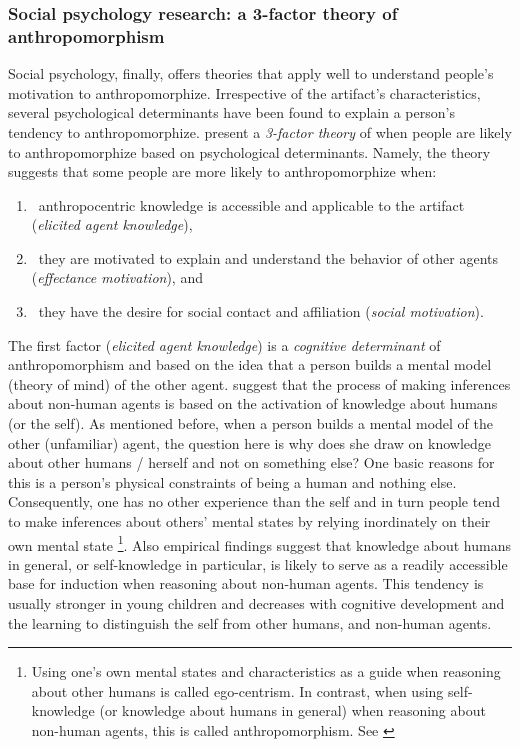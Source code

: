 \documentclass{frontiersSCNS} %
\begin{document}
\subsubsection{Social psychology research: a 3-factor theory of anthropomorphism}
\label{sec:psychological-factors}

Social psychology, finally, offers theories that apply well to understand
people's motivation to anthropomorphize. Irrespective of the artifact's
characteristics, several psychological determinants have been found to explain a
person's tendency to anthropomorphize. \cite{epley_seeing_2007} present a
\emph{3-factor theory} of when people are likely to anthropomorphize based on
psychological determinants. Namely, the theory suggests that some people are
more likely to anthropomorphize when: 

\begin{enumerate}
	\item ~anthropocentric knowledge is accessible and applicable to the artifact (\textit{elicited agent knowledge}),
	\item ~they are motivated to explain and understand the behavior of other agents (\textit{effectance motivation}), and
	\item ~they have the desire for social contact and affiliation (\textit{social motivation}).
\end{enumerate}

The first factor (\textit{elicited agent knowledge}) is a \emph{cognitive
determinant} of anthropomorphism and based on the idea that a person builds a
mental model (theory of mind) of the other agent. \citet{epley_seeing_2007}
suggest that the process of making inferences about non-human agents is based on
the activation of knowledge about humans (or the self). As mentioned before,
when a person builds a mental model of the other (unfamiliar) agent, the
question here is why does she draw on knowledge about other humans / herself and
not on something else? One basic reasons for this is a person's physical
constraints of being a human and nothing else. Consequently, one has no other
experience than the self and in turn people tend to make inferences about
others' mental states by relying inordinately on their own mental state
\footnote{Using one's own mental states and characteristics as a guide when
reasoning about other humans is called ego-centrism. In contrast, when using
self-knowledge (or knowledge about humans in general) when reasoning about
non-human agents, this is called anthropomorphism. See
\cite{epley_seeing_2007}}.  Also empirical findings suggest that knowledge about
humans in general, or self-knowledge in particular, is likely to serve as a
readily accessible base for induction when reasoning about non-human agents.
This tendency is usually stronger in young children and decreases with cognitive
development and the learning to distinguish the self from other humans, and
non-human agents. 
\end{document}
